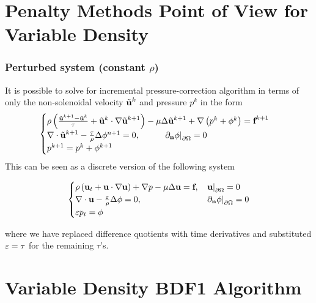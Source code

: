 \documentclass{beamer}
\begin{document}
%
%
%
\section[Penalty]{Penalty Methods Point of View for Variable Density}

\begin{frame}
  \frametitle{Perturbed system (constant $\rho$)}
  It is possible to solve for incremental pressure-correction algorithm in terms of only the non-solenoidal velocity $\tilde{\textbf{u}}^{k}$ and pressure $p^{k}$ in the form
  \begin{equation*}
    \begin{cases}
      \rho\left(\frac{\tilde{\textbf{u}}^{k+1} - \tilde{\textbf{u}}^{k}}{\tau} + \tilde{\textbf{u}}^{k}\cdot\nabla\tilde{\textbf{u}}^{k+1} \right) - \mu\Delta\tilde{\textbf{u}}^{k+1} + \nabla\left(p^{k} +\phi^{k}  \right) = \textbf{f}^{k+1}\\
      \nabla\cdot\tilde{\textbf{u}}^{k+1} - \frac{\tau}{\rho}\Delta\phi^{n+1} = 0, \hspace{1cm}\left.\partial_{\textbf{n}} \phi\right|_{\partial\Omega} = 0\\
      p^{k+1} = p^{k} + \phi^{k+1}
    \end{cases}
  \end{equation*}
  This can be seen as a discrete version of the following system %
  \begin{block}{}
  \begin{equation*}
    \begin{cases}
      \rho\left(\textbf{u}_t + \textbf{u}\cdot\nabla\textbf{u}  \right) + \nabla p -\mu\Delta\textbf{u} = \textbf{f}, & \left.\textbf{u}\right|_{\partial\Omega} = 0\\
      \nabla\cdot\textbf{u} - \frac{\varepsilon}{\rho}\Delta \phi = 0, & \left.\partial_{\textbf{n}} \phi\right|_{\partial\Omega} = 0\\
      \varepsilon p_t = \phi
    \end{cases}
    \end{equation*}
  \end{block}
  where we have replaced difference quotients with time derivatives and substituted $\varepsilon = \tau$ for the remaining $\tau$'s.
\end{frame}

%
%
%
\section[Variable Density]{Variable Density BDF1 Algorithm}
\end{document}
